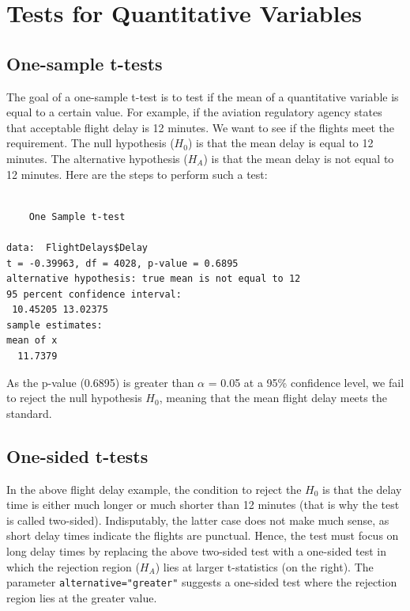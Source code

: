 \documentclass[
  letterpaper,
  DIV=11,
  numbers=noendperiod]{scrreprt}
\newenvironment{Shaded}{\begin{snugshade}}{\end{snugshade}}
\newcommand{\AttributeTok}[1]{\textcolor[rgb]{0.40,0.45,0.13}{#1}}
\newcommand{\DecValTok}[1]{\textcolor[rgb]{0.68,0.00,0.00}{#1}}
\newcommand{\FunctionTok}[1]{\textcolor[rgb]{0.28,0.35,0.67}{#1}}
\newcommand{\NormalTok}[1]{\textcolor[rgb]{0.00,0.23,0.31}{#1}}
\newcommand{\SpecialCharTok}[1]{\textcolor[rgb]{0.37,0.37,0.37}{#1}}
\begin{document}
\section{Tests for Quantitative
Variables}\label{tests-for-quantitative-variables}

\subsection{One-sample t-tests}\label{sec-04-one-sample-t-test}

The goal of a one-sample t-test is to test if the mean of a quantitative
variable is equal to a certain value. For example, if the aviation
regulatory agency states that acceptable flight delay is 12 minutes. We
want to see if the flights meet the requirement. The null hypothesis
(\(H_{0}\)) is that the mean delay is equal to 12 minutes. The
alternative hypothesis (\(H_{A}\)) is that the mean delay is not equal
to 12 minutes. Here are the steps to perform such a test:

\begin{Shaded}
\end{Shaded}

\begin{verbatim}

    One Sample t-test

data:  FlightDelays$Delay
t = -0.39963, df = 4028, p-value = 0.6895
alternative hypothesis: true mean is not equal to 12
95 percent confidence interval:
 10.45205 13.02375
sample estimates:
mean of x 
  11.7379 
\end{verbatim}

As the p-value (0.6895) is greater than \(\alpha\) = 0.05 at a 95\%
confidence level, we fail to reject the null hypothesis \(H_{0}\),
meaning that the mean flight delay meets the standard.

\subsection{One-sided t-tests}\label{one-sided-t-tests}

In the above flight delay example, the condition to reject the \(H_{0}\)
is that the delay time is either much longer or much shorter than 12
minutes (that is why the test is called two-sided). Indisputably, the
latter case does not make much sense, as short delay times indicate the
flights are punctual. Hence, the test must focus on long delay times by
replacing the above two-sided test with a one-sided test in which the
rejection region (\(H_{A}\)) lies at larger t-statistics (on the right).
The parameter \texttt{alternative="greater"} suggests a one-sided test
where the rejection region lies at the greater value.
\end{document}
